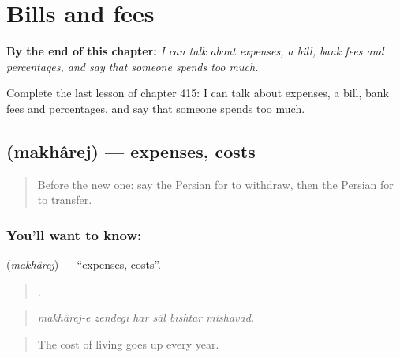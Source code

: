 
\chapter{Bills and fees}
\label{ch:fa-bills-and-fees}

\begin{chapteropening}
\textbf{By the end of this chapter:} \emph{I can talk about expenses, a bill, bank fees and percentages, and say that someone spends too much.}

Complete the last lesson of chapter 415: I can talk about expenses, a bill, bank fees and percentages, and say that someone spends too much.
\end{chapteropening}

\section[\texorpdfstring{\fa{مخارج} (makhârej)}{مخارج (makhârej)}]{ (makhârej) — expenses, costs}

\label{lesson:FA-C415-makharej}



\begin{quote}
Before the new one: say the Persian for to withdraw, then the Persian for to transfer.
\end{quote}

\subsection*{You'll want to know: }
\textbf{} (\emph{makhârej}) — \textquotedblleft{}expenses, costs\textquotedblright{}.

\begin{quote}
     .
\end{quote}

\begin{quote}
\emph{makhârej-e zendegi har sâl bishtar mishavad.}
\end{quote}

\begin{quote}
The cost of living goes up every year.
\end{quote}

